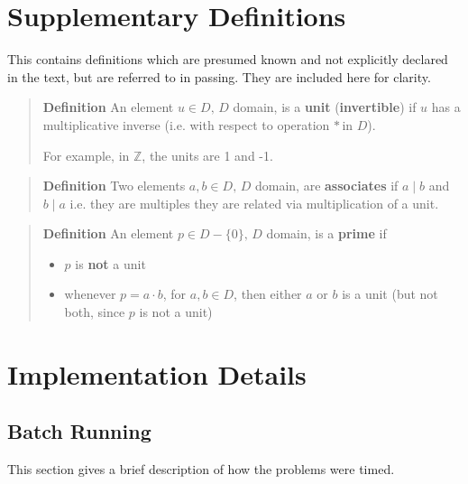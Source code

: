 \documentclass[letterpaper,12pt,titlepage,oneside,final]{book}
\newenvironment{defn}{\begin{quote}%
  \textbf{Definition }%
  \quad
}{%
\end{quote}%
}
\begin{document}
\begin{appendices}

\chapter{Supplementary Definitions}\label{appendix:definitions}

This contains definitions which are presumed known and not explicitly declared in the text, but are referred to in passing.  They are included here for clarity.

\begin{defn}\label{defn: Unit}
  An element ${u \in D, \, D}$ domain, is a \textbf{unit} (\textbf{invertible}) if ${u}$ has a multiplicative inverse (i.e. with respect to operation ${*\,}$in ${D}$).

  For example, in $\mathbb{Z}$, the units are 1 and -1.
\end{defn}

\begin{defn}\label{defn: Associate}
  Two elements ${a, b \in D, \, D}$ domain, are \textbf{associates} if ${a \mid b}$ and ${b \mid a}$ i.e. they are multiples they are related via multiplication of a unit. 
\end{defn}

\begin{defn}\label{defn: Prime}
  An element ${p \in D - \{0\}, \, D}$ domain, is a \textbf{prime} if
  \begin{itemize}
    \item ${p}$ is \textbf{not} a unit
    \item whenever ${p = a \cdot b}$, for ${a, b \in D}$, then either ${a}$ or ${b}$ is a unit (but not both, since ${p}$ is not a unit)
  \end{itemize}
\end{defn}


\chapter{Implementation Details}\label{appendix:running}

\section{Batch Running}

This section gives a brief description of how the problems were timed.


\end{appendices}
\end{document}
